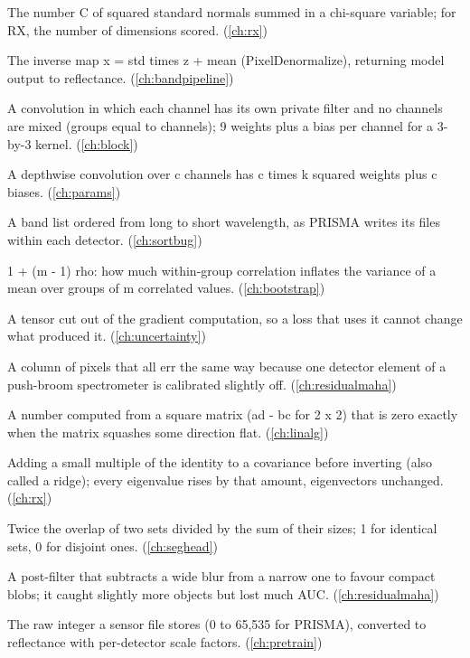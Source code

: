 \begin{description}[style=nextline,leftmargin=1.2em,font=\normalfont\bfseries]
\item[Degrees of freedom] The number C of squared standard normals summed in a chi-square variable; for RX, the number of dimensions scored. (\cref{ch:rx})
\item[Denormalisation] The inverse map x = std times z + mean (PixelDenormalize), returning model output to reflectance. (\cref{ch:bandpipeline})
\item[Depthwise convolution] A convolution in which each channel has its own private filter and no channels are mixed (groups equal to channels); 9 weights plus a bias per channel for a 3-by-3 kernel. (\cref{ch:block})
\item[Depthwise parameter rule] A depthwise convolution over c channels has c times k squared weights plus c biases. (\cref{ch:params})
\item[Descending band list] A band list ordered from long to short wavelength, as PRISMA writes its files within each detector. (\cref{ch:sortbug})
\item[Design effect] 1 + (m - 1) rho: how much within-group correlation inflates the variance of a mean over groups of m correlated values. (\cref{ch:bootstrap})
\item[Detached tensor] A tensor cut out of the gradient computation, so a loss that uses it cannot change what produced it. (\cref{ch:uncertainty})
\item[Detector stripe] A column of pixels that all err the same way because one detector element of a push-broom spectrometer is calibrated slightly off. (\cref{ch:residualmaha})
\item[Determinant] A number computed from a square matrix (ad - bc for 2 x 2) that is zero exactly when the matrix squashes some direction flat. (\cref{ch:linalg})
\item[Diagonal loading] Adding a small multiple of the identity to a covariance before inverting (also called a ridge); every eigenvalue rises by that amount, eigenvectors unchanged. (\cref{ch:rx})
\item[Dice coefficient] Twice the overlap of two sets divided by the sum of their sizes; 1 for identical sets, 0 for disjoint ones. (\cref{ch:seghead})
\item[Difference-of-Gaussians boost] A post-filter that subtracts a wide blur from a narrow one to favour compact blobs; it caught slightly more objects but lost much AUC. (\cref{ch:residualmaha})
\item[Digital number] The raw integer a sensor file stores (0 to 65,535 for PRISMA), converted to reflectance with per-detector scale factors. (\cref{ch:pretrain})

\end{description}
